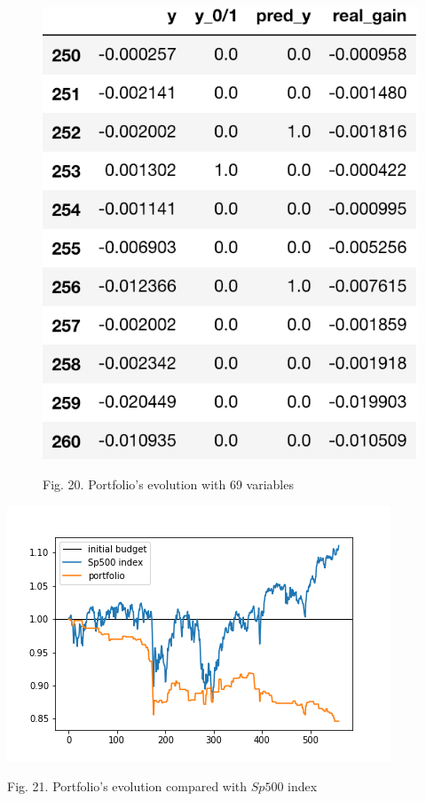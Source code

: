 \documentclass{article}%
\begin{document}
  \begin{figure}[h!]
  \centering
  \includegraphics[scale=0.55]{act_port_log.png}
  \begin{center}
\begin{small}
Fig. 20. Portfolio's evolution with 69 variables
\end{small}
\end{center}
  \label{portfolio_table_logit}
  \end{figure}
  
  
  \includegraphics[scale=0.6]{act_portfolio_logit.png}
  \begin{center}
\begin{small}
Fig. 21. Portfolio's evolution compared with $Sp500$ index
\end{small}
\end{center}
  \label{portfolio_graph_logit}
\end{document}
